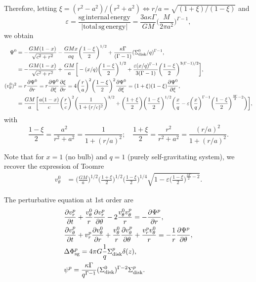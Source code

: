 \documentclass[11pt]{article}
\newcommand{\vr}{v_{r}}
\newcommand{\vt}{v_{\theta}}
\newcommand{\Sigmad}{\Sigma_{\rm{disk}}}
\newcommand{\Phisg}{\Phi_{\rm{sg}}}
\begin{document}
Therefore, letting $\xi = (r^2-a^2)/(r^2+a^2)\Leftrightarrow r/a=\sqrt{(1+\xi)/(1-\xi)}$ and  $$\varepsilon = \frac{\mathrm{sg \, internal \, energy}}{|\mathrm{total \,sg \,   energy}|} =\frac{3a \kappa \Gamma}{GM} \bigg(\frac{M}{2\pi a^2}\bigg)^{\Gamma-1},$$  we obtain
\begin{align*}
\Psi^0 &=  - \frac{G M (1-x)}{\sqrt{c^2+r^2}}-\frac{G M x}{a q}\bigg(\frac{1-\xi}{2}\bigg)^{1/2} + \frac{\kappa \Gamma}{(\Gamma-1)} (\Sigmad^0/q)^{\Gamma-1} ,\\
{}&=  -\frac{G M (1-x)}{\sqrt{c^2+r^2}}+\frac{G M }{a} \bigg[-(x/q)\bigg(\frac{1-\xi}{2}\bigg)^{1/2} + \frac{\varepsilon(x/q)^{\Gamma-1}}{3(\Gamma-1)}\bigg(\frac{1-\xi}{2}\bigg)^{3(\Gamma-1)/2} \bigg] ,\\
(\vt^0)^2 &= r \frac{\partial \Psi^0}{\partial r} =r \frac{\partial \Psi^0}{\partial \xi} \frac{\partial \xi}
{\partial r} = 4\bigg(\frac{r}{a}\bigg)^2    \bigg(\frac{1-\xi}{2}\bigg)^2 \frac{\partial \Psi^0}{\partial \xi}= (1+\xi) (1-\xi) \frac{\partial \Psi^0}{\partial \xi}  ,\\
&=\frac{GM}{a}\bigg[\frac{a(1-x)}{c}\bigg( \frac{r}{c}\bigg)^2 \bigg(\frac{1}{1+(r/c)^2}\bigg)^{3/2} 
+ \bigg(\frac{1+\xi}{2}\bigg) \bigg(\frac{1-\xi}{2}\bigg)^{1/2}  \bigg(\frac{x}{q}- \varepsilon\bigg(\frac{x}{q}\bigg)^{\Gamma-1}\bigg(\frac{1-\xi}{2}\bigg)^{\frac{3\Gamma}{2}-2} \bigg) \bigg],
\end{align*}
with
$$\frac{1-\xi}{2}= \frac{a^2}{r^2+a^2}= \frac{1}{1+(r/a)^2}; \quad \frac{1+\xi}{2}= \frac{r^2}{r^2+a^2}= \frac{(r/a)^2}{1+(r/a)^2}.$$

Note that for $x=1$ (no bulb) and $q=1$ (purely self-gravitating system), we recover the expression of Toomre
\begin{align*}
\vt^0 &=\bigg(\frac{GM}{a} \bigg)^{1/2}\bigg(\frac{1+\xi}{2}\bigg)^{1/2} \bigg(\frac{1-\xi}{2}\bigg)^{1/4}  \sqrt{1- \varepsilon \bigg(\frac{1-\xi}{2}\bigg)^{\frac{3\Gamma}{2}-2}} .
\end{align*}

The perturbative equation at 1st order are
\begin{align*}
&\frac{\partial \vr^p}{\partial t} + \frac{\vt^0}{r} \frac{\partial \vr^p}{\partial \theta} - 2\frac{\vt^0 \vt^p}{r} = -\frac{\partial \Psi^p}{\partial r} ,\\
&\frac{\partial \vt^p}{\partial t} + \vr^p \frac{\partial \vt^0}{\partial r} + \frac{\vt^0}{r} \frac{\partial \vt^p}{\partial \theta} + \frac{\vr^p\vt^0}{r} = -\frac{1}{r}\frac{\partial \Psi^p}{\partial \theta} ,\\
& \Delta \Phisg^p = 4\pi G \frac{1}{q} \Sigmad^p \delta (z), \\
& \psi^p =  \frac{\kappa \Gamma}{q^{\Gamma-1}} (\Sigmad^0)^{\Gamma-2} \Sigmad^p .
\end{align*}
\end{document}
